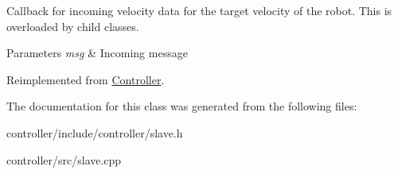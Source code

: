 Callback for incoming velocity data for the target velocity of the robot. This is overloaded by child classes. 


\begin{DoxyParams}{Parameters}
{\em msg} & Incoming message \\
\hline
\end{DoxyParams}


Reimplemented from \hyperlink{classController_afa31080c1ed1e652410c5e97472b3ea5}{Controller}.



The documentation for this class was generated from the following files\+:\begin{DoxyCompactItemize}
\item 
controller/include/controller/slave.\+h\item 
controller/src/slave.\+cpp\end{DoxyCompactItemize}
